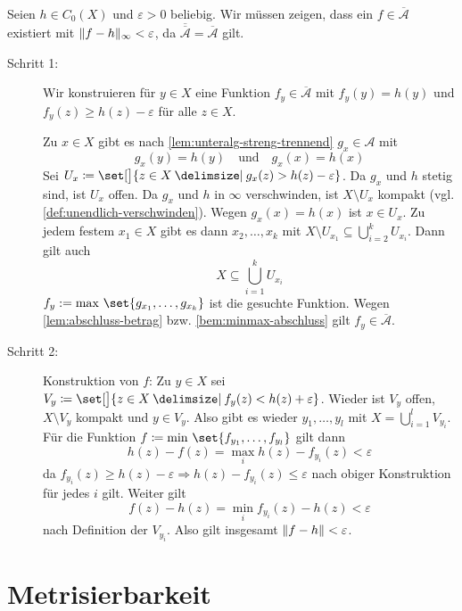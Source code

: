\begin{beweis}[{name={von \cref{satz:stone-weier}}}]
	Seien $h \in C_0(X)$ und $\varepsilon>0$ beliebig.
	Wir müssen zeigen, dass ein $f \in \overline{\mathcal{A}}$ existiert mit $\Vert f-h\Vert_\infty < \varepsilon$, da $\overline{\overline{\mathcal{A}}}= \overline{\mathcal{A}}$ gilt.
	\begin{description}
		\item[Schritt 1:] Wir konstruieren für $y \in X$ eine Funktion $f_y \in \overline{\mathcal{A}}$ mit $f_y(y) = h(y)$ und $f_y(z) \ge h(z) - \varepsilon$ für alle $z \in X$.
		
		Zu $x \in X$ gibt es nach \cref{lem:unteralg-streng-trennend} $g_x \in \mathcal{A}$ mit 
		\[
			g_x(y) = h(y) \quad \text{und} \quad g_x(x) = h(x)
		\]
		Sei $U_x \coloneqq \set[\big]{z \in X \given g_x(z) > h(z) - \varepsilon}$. 
		Da $g_x$ und $h$ stetig sind, ist $U_x$ offen. Da $g_x$ und $h$ in $\infty$ verschwinden, ist $X \setminus U_x$ kompakt (vgl. \cref{def:unendlich-verschwinden}).
		Wegen $g_x(x)= h(x)$ ist $x \in U_x$. 
		Zu jedem festem $x_1 \in X$ gibt es dann $x_2, \ldots , x_k$ mit $X \setminus U_{x_1} \subseteq \bigcup_{i=2}^k U_{x_i}$.
		Dann gilt auch 
		\[
			X \subseteq \bigcup_{i=1}^k U_{x_i}
		\]
		$f_y := \max \,\set{g_{x_1}, \ldots , g_{x_k}}$ ist die gesuchte Funktion. 
		Wegen \cref{lem:abschluss-betrag} bzw.  \cref{bem:minmax-abschluss} gilt $f_y \in \overline{\mathcal{A}}$.
		\item[Schritt 2:] Konstruktion von $f$: 
		Zu $y \in X$ sei $V_y \coloneqq \set[\big]{z \in X \given f_y(z) < h(z)+ \varepsilon}$. 
		Wieder ist $V_y$ offen, $X\setminus V_y$ kompakt und $y \in V_y$. 
		Also gibt es wieder $y_1, \ldots , y_l$ mit $X = \bigcup_{i=1}^l V_{y_i}$. 
		Für die Funktion $f \coloneqq \min\, \set{f_{y_1}, \ldots , f_{y_l}}$ gilt dann
		\[
			h(z) - f(z) = \max_i h(z)- f_{y_i} (z) < \varepsilon
		\]
		da $f_{y_i}(z) \ge h(z) -\varepsilon\Rightarrow  h(z)- f_{y_i}(z) \le \varepsilon$ nach obiger Konstruktion für jedes $i$ gilt. 
		Weiter gilt
		\[
			f(z)- h(z) = \min_i f_{y_i}(z)- h(z) < \varepsilon
		\]
		nach Definition der $V_{y_i}$. 
		Also gilt insgesamt $\norm[\infty]{f-h} < \varepsilon$.
	\end{description}
\end{beweis}

\newpage
\section{Metrisierbarkeit} %
\label{sec:metrisierbarkeit}

